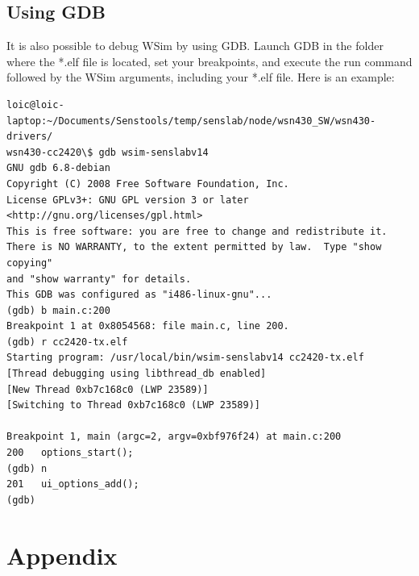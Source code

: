 \documentclass[a4paper,10pt]{report}
\begin{document}
\section{Using GDB}
It is also possible to debug WSim by using GDB. Launch GDB in the folder where the *.elf file is located, set your breakpoints, and execute the run command followed by the WSim arguments, including your *.elf file. Here is an example:
\begin{verbatim}
loic@loic-laptop:~/Documents/Senstools/temp/senslab/node/wsn430_SW/wsn430-drivers/
wsn430-cc2420\$ gdb wsim-senslabv14
GNU gdb 6.8-debian
Copyright (C) 2008 Free Software Foundation, Inc.
License GPLv3+: GNU GPL version 3 or later <http://gnu.org/licenses/gpl.html>
This is free software: you are free to change and redistribute it.
There is NO WARRANTY, to the extent permitted by law.  Type "show copying"
and "show warranty" for details.
This GDB was configured as "i486-linux-gnu"...
(gdb) b main.c:200
Breakpoint 1 at 0x8054568: file main.c, line 200.
(gdb) r cc2420-tx.elf 
Starting program: /usr/local/bin/wsim-senslabv14 cc2420-tx.elf
[Thread debugging using libthread_db enabled]
[New Thread 0xb7c168c0 (LWP 23589)]
[Switching to Thread 0xb7c168c0 (LWP 23589)]

Breakpoint 1, main (argc=2, argv=0xbf976f24) at main.c:200
200	  options_start();
(gdb) n
201	  ui_options_add();
(gdb) 
\end{verbatim}


\chapter{Appendix}
\end{document}
